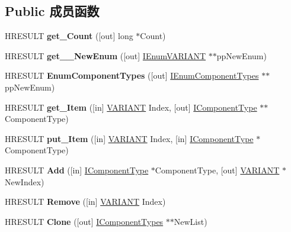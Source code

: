 \subsection*{Public 成员函数}
\begin{DoxyCompactItemize}
\item 
\mbox{\label{interface_i_component_types_aec9b72386782dbc432bbb974e787639e}} 
H\+R\+E\+S\+U\+LT {\bfseries get\+\_\+\+Count} (\mbox{[}out\mbox{]} long $\ast$Count)
\item 
\mbox{\label{interface_i_component_types_a78dbb086a0ee0b8e5a7b000acce560bd}} 
H\+R\+E\+S\+U\+LT {\bfseries get\+\_\+\+\_\+\+New\+Enum} (\mbox{[}out\mbox{]} \hyperlink{interface_i_enum_v_a_r_i_a_n_t}{I\+Enum\+V\+A\+R\+I\+A\+NT} $\ast$$\ast$pp\+New\+Enum)
\item 
\mbox{\label{interface_i_component_types_a2499675b552d9dca13e27adc6bd0eb68}} 
H\+R\+E\+S\+U\+LT {\bfseries Enum\+Component\+Types} (\mbox{[}out\mbox{]} \hyperlink{interface_i_enum_component_types}{I\+Enum\+Component\+Types} $\ast$$\ast$pp\+New\+Enum)
\item 
\mbox{\label{interface_i_component_types_aedac45e9cabf2229e0d07b58733789d0}} 
H\+R\+E\+S\+U\+LT {\bfseries get\+\_\+\+Item} (\mbox{[}in\mbox{]} \hyperlink{structtag_v_a_r_i_a_n_t}{V\+A\+R\+I\+A\+NT} Index, \mbox{[}out\mbox{]} \hyperlink{interface_i_component_type}{I\+Component\+Type} $\ast$$\ast$Component\+Type)
\item 
\mbox{\label{interface_i_component_types_a8aece969af690f879febd2bd383b8091}} 
H\+R\+E\+S\+U\+LT {\bfseries put\+\_\+\+Item} (\mbox{[}in\mbox{]} \hyperlink{structtag_v_a_r_i_a_n_t}{V\+A\+R\+I\+A\+NT} Index, \mbox{[}in\mbox{]} \hyperlink{interface_i_component_type}{I\+Component\+Type} $\ast$Component\+Type)
\item 
\mbox{\label{interface_i_component_types_acf1269c0406e6f8c401ae187caf2b8c1}} 
H\+R\+E\+S\+U\+LT {\bfseries Add} (\mbox{[}in\mbox{]} \hyperlink{interface_i_component_type}{I\+Component\+Type} $\ast$Component\+Type, \mbox{[}out\mbox{]} \hyperlink{structtag_v_a_r_i_a_n_t}{V\+A\+R\+I\+A\+NT} $\ast$New\+Index)
\item 
\mbox{\label{interface_i_component_types_a80c76330caf6cbd4f861ae90d67dbb7c}} 
H\+R\+E\+S\+U\+LT {\bfseries Remove} (\mbox{[}in\mbox{]} \hyperlink{structtag_v_a_r_i_a_n_t}{V\+A\+R\+I\+A\+NT} Index)
\item 
\mbox{\label{interface_i_component_types_ad087e1b29cfa5e961c9e317912900850}} 
H\+R\+E\+S\+U\+LT {\bfseries Clone} (\mbox{[}out\mbox{]} \hyperlink{interface_i_component_types}{I\+Component\+Types} $\ast$$\ast$New\+List)
\end{DoxyCompactItemize}
